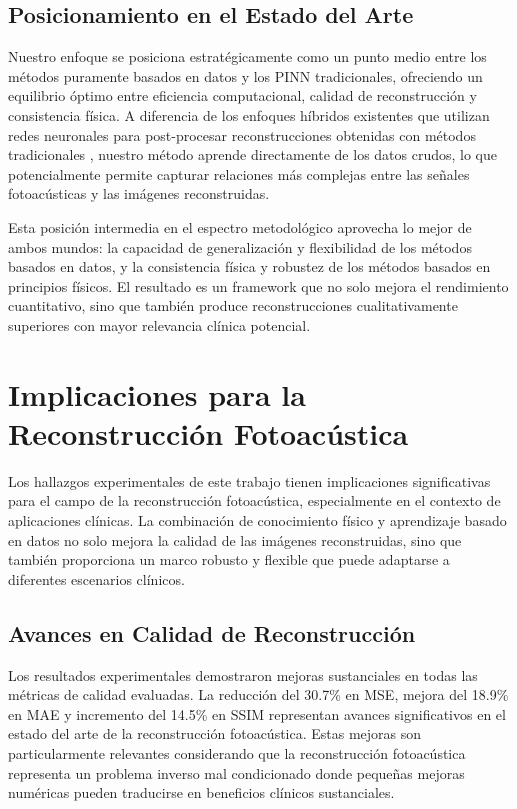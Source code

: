 \subsection{Posicionamiento en el Estado del Arte}

Nuestro enfoque se posiciona estratégicamente como un punto medio entre los métodos puramente basados en datos y los PINN tradicionales, ofreciendo un equilibrio óptimo entre eficiencia computacional, calidad de reconstrucción y consistencia física. A diferencia de los enfoques híbridos existentes que utilizan redes neuronales para post-procesar reconstrucciones obtenidas con métodos tradicionales \cite{guan2020fully}, nuestro método aprende directamente de los datos crudos, lo que potencialmente permite capturar relaciones más complejas entre las señales fotoacústicas y las imágenes reconstruidas.

Esta posición intermedia en el espectro metodológico aprovecha lo mejor de ambos mundos: la capacidad de generalización y flexibilidad de los métodos basados en datos, y la consistencia física y robustez de los métodos basados en principios físicos. El resultado es un framework que no solo mejora el rendimiento cuantitativo, sino que también produce reconstrucciones cualitativamente superiores con mayor relevancia clínica potencial.

\section{Implicaciones para la Reconstrucción Fotoacústica}

Los hallazgos experimentales de este trabajo tienen implicaciones significativas para el campo de la reconstrucción fotoacústica, especialmente en el contexto de aplicaciones clínicas. La combinación de conocimiento físico y aprendizaje basado en datos no solo mejora la calidad de las imágenes reconstruidas, sino que también proporciona un marco robusto y flexible que puede adaptarse a diferentes escenarios clínicos.

\subsection{Avances en Calidad de Reconstrucción}

Los resultados experimentales demostraron mejoras sustanciales en todas las métricas de calidad evaluadas. La reducción del 30.7\% en MSE, mejora del 18.9\% en MAE y incremento del 14.5\% en SSIM representan avances significativos en el estado del arte de la reconstrucción fotoacústica. Estas mejoras son particularmente relevantes considerando que la reconstrucción fotoacústica representa un problema inverso mal condicionado donde pequeñas mejoras numéricas pueden traducirse en beneficios clínicos sustanciales.

